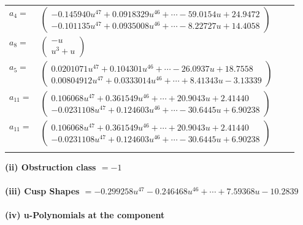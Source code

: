 \documentclass[1p]{elsarticle_modified}
\theoremstyle{definition}
\begin{document}
\begin{tabular}{m{7pt} m{180pt} m{7pt} m{180pt} }
\flushright $a_{4}=$&$\begin{pmatrix}-0.145940 u^{47}+0.0918329 u^{46}+\cdots-59.0154 u+24.9472\\-0.101135 u^{47}+0.0935008 u^{46}+\cdots-8.22727 u+14.4058\end{pmatrix}$ \\
\flushright $a_{8}=$&$\begin{pmatrix}- u\\u^3+u\end{pmatrix}$ \\
\flushright $a_{5}=$&$\begin{pmatrix}0.0201071 u^{47}+0.104301 u^{46}+\cdots-26.0937 u+18.7558\\0.00804912 u^{47}+0.0333014 u^{46}+\cdots+8.41343 u-3.13339\end{pmatrix}$ \\
\flushright $a_{11}=$&$\begin{pmatrix}0.106068 u^{47}+0.361549 u^{46}+\cdots+20.9043 u+2.41440\\-0.0231108 u^{47}+0.124603 u^{46}+\cdots-30.6445 u+6.90238\end{pmatrix}$\\ \flushright $a_{11}=$&$\begin{pmatrix}0.106068 u^{47}+0.361549 u^{46}+\cdots+20.9043 u+2.41440\\-0.0231108 u^{47}+0.124603 u^{46}+\cdots-30.6445 u+6.90238\end{pmatrix}$\\&\end{tabular}
\flushleft \textbf{(ii) Obstruction class $= -1$}\\~\\
\flushleft \textbf{(iii) Cusp Shapes $= -0.299258 u^{47}-0.246468 u^{46}+\cdots+7.59368 u-10.2839$}\\~\\
\newpage\renewcommand{\arraystretch}{1}
\flushleft \textbf{(iv) u-Polynomials at the component}\newline \\
\end{document}
